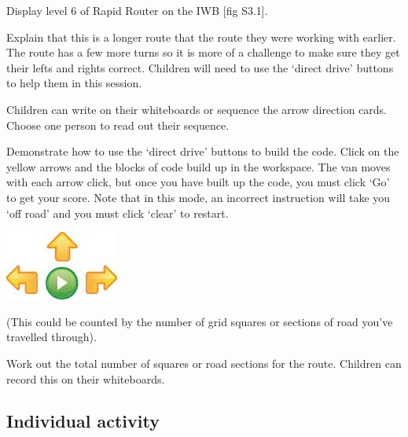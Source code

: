 \documentclass{../../../lessonplan}
\begin{document}
\begin{lessonplan}

Display level 6 of Rapid Router on the IWB [fig S3.1].


Explain that this is a longer route that the route they were working with earlier.
The route has a few more turns so it is more of a challenge to make sure they get their lefts and rights correct.
Children will need to use the `direct drive' buttons to help them in this session.


Children can write on their whiteboards or sequence the arrow direction cards.
Choose one person to read out their sequence.

Demonstrate how to use the `direct drive' buttons to build the code.
Click on the yellow arrows and the blocks of code build up in the workspace.
The van moves with each arrow click, but once you have built up the code, you must click `Go' to get your score.
Note that in this mode, an incorrect instruction will take you `off road' and you must click `clear' to restart.

\begin{center}
\includegraphics[width=.667\linewidth]{Arrows.jpg}
\end{center}

(This could be counted by the number of grid squares or sections of road you've travelled through).

Work out the total number of squares or road sections for the route.
Children can record this on their whiteboards.

\subsection*{Individual activity}


\end{lessonplan}
\end{document}
